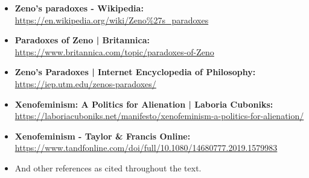 \documentclass[12pt]{article}
\begin{document}
\begin{itemize}
    \item \textbf{Zeno's paradoxes - Wikipedia:} \\
          \url{https://en.wikipedia.org/wiki/Zeno%27s_paradoxes}
    \item \textbf{Paradoxes of Zeno | Britannica:} \\
          \url{https://www.britannica.com/topic/paradoxes-of-Zeno}
    \item \textbf{Zeno's Paradoxes | Internet Encyclopedia of Philosophy:} \\
          \url{https://iep.utm.edu/zenos-paradoxes/}
    \item \textbf{Xenofeminism: A Politics for Alienation | Laboria Cuboniks:} \\
          \url{https://laboriacuboniks.net/manifesto/xenofeminism-a-politics-for-alienation/}
    \item \textbf{Xenofeminism - Taylor \& Francis Online:} \\
          \url{https://www.tandfonline.com/doi/full/10.1080/14680777.2019.1579983}
    \item And other references as cited throughout the text.
\end{itemize}
\end{document}
